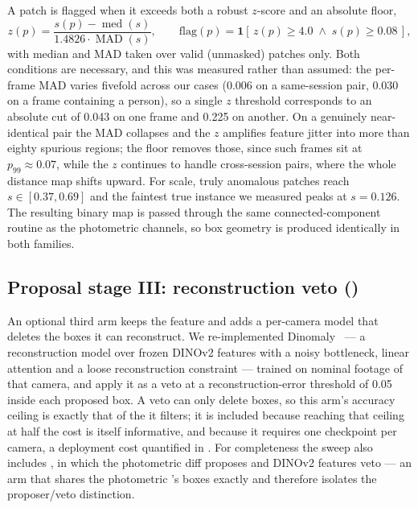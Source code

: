 A patch is flagged when it exceeds both a robust $z$-score and an absolute
floor,
%
\begin{equation}
  z(p) = \frac{s(p) - \operatorname{med}(s)}{1.4826 \cdot \operatorname{MAD}(s)},
  \qquad
  \text{flag}(p) = \mathbf{1}\!\left[\, z(p) \ge 4.0 \;\wedge\; s(p) \ge 0.08 \,\right],
  \label{eq:dinothr}
\end{equation}
%
with median and MAD taken over valid (unmasked) patches only. Both conditions
are necessary, and this was measured rather than assumed: the per-frame MAD
varies fivefold across our cases (0.006 on a same-session pair, 0.030 on a
frame containing a person), so a single $z$ threshold corresponds to an
absolute cut of 0.043 on one frame and 0.225 on another. On a genuinely
near-identical pair the MAD collapses and the $z$ amplifies feature jitter into
more than eighty spurious regions; the floor removes those, since such frames
sit at $p_{99} \approx 0.07$, while the $z$ continues to handle cross-session
pairs, where the whole distance map shifts upward. For scale, truly anomalous
patches reach $s \in [0.37, 0.69]$ and the faintest true instance we measured
peaks at $s = 0.126$. The resulting binary map is passed through the same
connected-component routine as the photometric channels, so box geometry is
produced identically in both families.

\subsection{Proposal stage III: reconstruction veto (\armdinodinomaly)}
\label{sec:method:veto}

An optional third arm keeps the feature \proposer{} and adds a per-camera model
that deletes the boxes it can reconstruct. We re-implemented
Dinomaly~\cite{Guo_2025} --- a reconstruction model over frozen DINOv2 features
with a noisy bottleneck, linear attention and a loose reconstruction constraint
--- trained on nominal footage of that camera, and apply it as a veto at a
reconstruction-error threshold of 0.05 inside each proposed box. A veto can
only delete boxes, so this arm's accuracy ceiling is exactly that of the
\proposer{} it filters; it is included because reaching that ceiling at half
the cost is itself informative, and because it requires one checkpoint per
camera, a deployment cost quantified in . For
completeness the sweep also includes \armphotodino{}, in which the photometric
diff proposes and DINOv2 features veto --- an arm that shares the photometric
\proposer{}'s boxes exactly and therefore isolates the proposer/veto
distinction.

